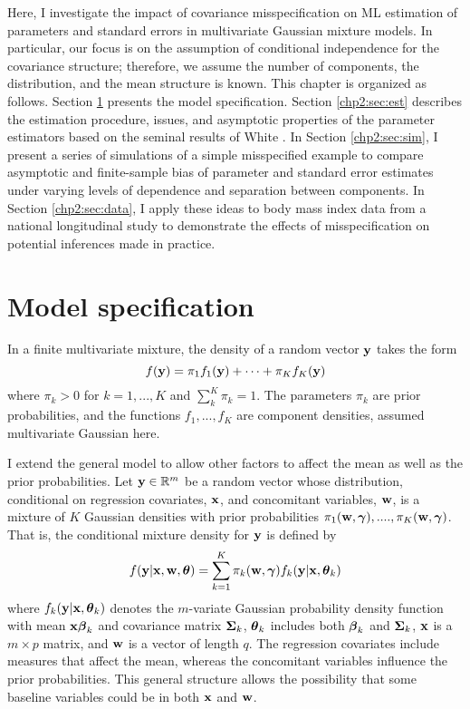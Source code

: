 Here, I investigate the impact of covariance misspecification on ML estimation of parameters and standard errors in multivariate Gaussian mixture models. In particular, our focus is on the assumption of conditional independence for the covariance structure; therefore, we assume the number of components, the distribution, and the mean structure is known. This chapter is organized as follows. Section \ref{chp2:sec:model} presents the model specification. Section \ref{chp2:sec:est} describes the estimation procedure, issues, and asymptotic properties of the parameter estimators based on the seminal results of White \cite{white1982}.  In Section \ref{chp2:sec:sim}, I present a series of simulations of a simple misspecified example to compare asymptotic and finite-sample bias of parameter and standard error estimates under varying levels of dependence and separation between components. In Section \ref{chp2:sec:data}, I apply these ideas to body mass index data from a national longitudinal study to demonstrate the effects of misspecification on potential inferences made in practice. 

\section{Model specification}\label{chp2:sec:model}
In a finite multivariate mixture, the density of a random vector $\mathbf y$ takes the form
$$f(\mathbf y)=\pi_{1}f_{1}(\mathbf y)+\cdots+\pi_{K}f_{K}(\mathbf y)$$
where $\pi_{k}>0$ for $k=1,...,K$ and $\sum^{K}_{k}\pi_{k}=1$. The parameters $\pi_{k}$ are prior probabilities, and the functions $f_{1},...,f_{K}$ are component densities, assumed multivariate Gaussian here. 

I extend the general model to allow other factors to affect the mean as well as the prior probabilities. Let $\mathbf y\in\mathbb{R}^{m}$ be a random vector whose distribution, conditional on regression covariates, $\mathbf x$, and concomitant variables, $\mathbf w$, is a mixture of $K$ Gaussian densities with prior probabilities $\pi_{1}(\mathbf w,\boldsymbol \gamma),....,\pi_{K}(\mathbf w,\boldsymbol \gamma)$. That is, the conditional mixture density for $\mathbf y$ is defined by
\begin{align}
f(\mathbf y|\mathbf x,\mathbf w,\boldsymbol \theta)=\sum^{K}_{k=1}\pi_{k}(\mathbf w,\boldsymbol\gamma)f_{k}(\mathbf y|\mathbf x,\boldsymbol\theta_{k}) \label{mixdens}
\end{align}
where $f_{k}(\mathbf y|\mathbf x,\boldsymbol\theta_{k})$ denotes the $m$-variate Gaussian probability density function with mean $\mathbf x\boldsymbol \beta_{k}$ and covariance matrix $\boldsymbol\Sigma_{k}$, $\boldsymbol\theta_{k}$ includes both $\boldsymbol\beta_{k}$ and $\boldsymbol\Sigma_{k}$, $\mathbf x$ is a $m\times p$ matrix, and $\mathbf w$ is a vector of length $q$. The regression covariates include measures that affect the mean, whereas the concomitant variables influence the prior probabilities. This general structure allows the possibility that some baseline variables could be in both $\mathbf x$ and $\mathbf w$. 

